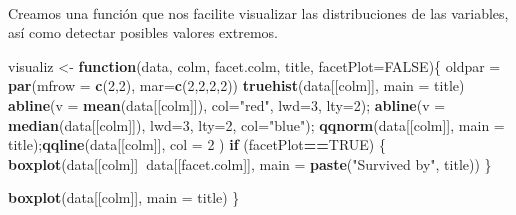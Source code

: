 \documentclass[
]{article}
\newenvironment{Shaded}{\begin{snugshade}}{\end{snugshade}}
\newcommand{\CommentTok}[1]{\textcolor[rgb]{0.56,0.35,0.01}{\textit{#1}}}
\newcommand{\ControlFlowTok}[1]{\textcolor[rgb]{0.13,0.29,0.53}{\textbf{#1}}}
\newcommand{\DataTypeTok}[1]{\textcolor[rgb]{0.13,0.29,0.53}{#1}}
\newcommand{\DecValTok}[1]{\textcolor[rgb]{0.00,0.00,0.81}{#1}}
\newcommand{\KeywordTok}[1]{\textcolor[rgb]{0.13,0.29,0.53}{\textbf{#1}}}
\newcommand{\NormalTok}[1]{#1}
\newcommand{\OperatorTok}[1]{\textcolor[rgb]{0.81,0.36,0.00}{\textbf{#1}}}
\newcommand{\OtherTok}[1]{\textcolor[rgb]{0.56,0.35,0.01}{#1}}
\newcommand{\StringTok}[1]{\textcolor[rgb]{0.31,0.60,0.02}{#1}}
\begin{document}
\begin{Shaded}
\end{Shaded}

\texttt{}~\\
\texttt{}

Creamos una función que nos facilite visualizar las distribuciones de
las variables, así como detectar posibles valores extremos.\\
\texttt{}

\begin{Shaded}
\begin{Highlighting}[]
\NormalTok{visualiz <-}\StringTok{ }\ControlFlowTok{function}\NormalTok{(data, colm, facet.colm, title, }\DataTypeTok{facetPlot=}\OtherTok{FALSE}\NormalTok{)\{}
\NormalTok{oldpar =}\StringTok{ }\KeywordTok{par}\NormalTok{(}\DataTypeTok{mfrow =} \KeywordTok{c}\NormalTok{(}\DecValTok{2}\NormalTok{,}\DecValTok{2}\NormalTok{), }\DataTypeTok{mar=}\KeywordTok{c}\NormalTok{(}\DecValTok{2}\NormalTok{,}\DecValTok{2}\NormalTok{,}\DecValTok{2}\NormalTok{,}\DecValTok{2}\NormalTok{))}
\KeywordTok{truehist}\NormalTok{(data[[colm]], }\DataTypeTok{main =}\NormalTok{ title)}
\KeywordTok{abline}\NormalTok{(}\DataTypeTok{v =} \KeywordTok{mean}\NormalTok{(data[[colm]]), }\DataTypeTok{col=}\StringTok{"red"}\NormalTok{, }\DataTypeTok{lwd=}\DecValTok{3}\NormalTok{, }\DataTypeTok{lty=}\DecValTok{2}\NormalTok{);}
\KeywordTok{abline}\NormalTok{(}\DataTypeTok{v =} \KeywordTok{median}\NormalTok{(data[[colm]]), }\DataTypeTok{lwd=}\DecValTok{3}\NormalTok{, }\DataTypeTok{lty=}\DecValTok{2}\NormalTok{, }\DataTypeTok{col=}\StringTok{"blue"}\NormalTok{);}
\KeywordTok{qqnorm}\NormalTok{(data[[colm]], }\DataTypeTok{main =}\NormalTok{ title);}\KeywordTok{qqline}\NormalTok{(data[[colm]], }\DataTypeTok{col =} \DecValTok{2}\NormalTok{ )}
\ControlFlowTok{if}\NormalTok{ (facetPlot}\OperatorTok{==}\OtherTok{TRUE}\NormalTok{) \{}
  \KeywordTok{boxplot}\NormalTok{(data[[colm]]}\OperatorTok{~}\NormalTok{data[[facet.colm]], }\DataTypeTok{main =} \KeywordTok{paste}\NormalTok{(}\StringTok{"Survived by"}\NormalTok{, title))}
\NormalTok{\}}

\KeywordTok{boxplot}\NormalTok{(data[[colm]], }\DataTypeTok{main =}\NormalTok{ title)}
\NormalTok{\}}
\end{Highlighting}
\end{Shaded}
\end{document}
